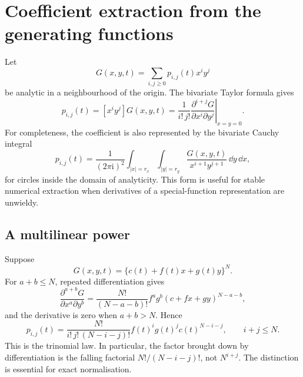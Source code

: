 \section{Coefficient extraction from the generating functions}
\label{app:coefficient-extraction}

Let
\begin{equation}
  G(x,y,t)=\sum_{i,j\geq0}p_{i,j}(t)x^iy^j
  \label{eq:appendix-pgf-series}
\end{equation}
be analytic in a neighbourhood of the origin.  The bivariate Taylor formula gives
\begin{equation}
  p_{i,j}(t)
  =[x^iy^j]G(x,y,t)
  =\frac{1}{i!\,j!}
   \left.
   \frac{\partial^{i+j}G}
        {\partial x^i\partial y^j}
   \right|_{x=y=0}.
  \label{eq:appendix-state-probability}
\end{equation}
For completeness, the coefficient is also represented by the bivariate Cauchy
integral
\begin{equation}
  p_{i,j}(t)
  =\frac{1}{(2\pi\mathrm i)^2}
   \int_{|x|=r_x}\int_{|y|=r_y}
   \frac{G(x,y,t)}
        {x^{i+1}y^{j+1}}\,\dd y\,\dd x,
  \label{eq:bivariate-cauchy}
\end{equation}
for circles inside the domain of analyticity.  This form is useful for stable
numerical extraction when derivatives of a special-function representation are
unwieldy.

\subsection{A multilinear power}

Suppose
\begin{equation}
  G(x,y,t)=\{c(t)+f(t)x+g(t)y\}^{N}.
  \label{eq:multilinear-power}
\end{equation}
For \(a+b\leq N\), repeated differentiation gives
\begin{equation}
  \frac{\partial^{a+b}G}{\partial x^a\partial y^b}
  =
  \frac{N!}{(N-a-b)!}
  f^ag^b(c+fx+gy)^{N-a-b},
  \label{eq:multilinear-derivative}
\end{equation}
and the derivative is zero when \(a+b>N\).  Hence
\begin{equation}
  p_{i,j}(t)
  =
  \frac{N!}{i!\,j!\,(N-i-j)!}
  f(t)^i g(t)^j c(t)^{N-i-j},
  \qquad i+j\leq N.
  \label{eq:trinomial-probability}
\end{equation}
This is the trinomial law.  In particular, the factor brought down by
differentiation is the falling factorial \(N!/(N-i-j)!\), not \(N^{i+j}\).
The distinction is essential for exact normalisation.


